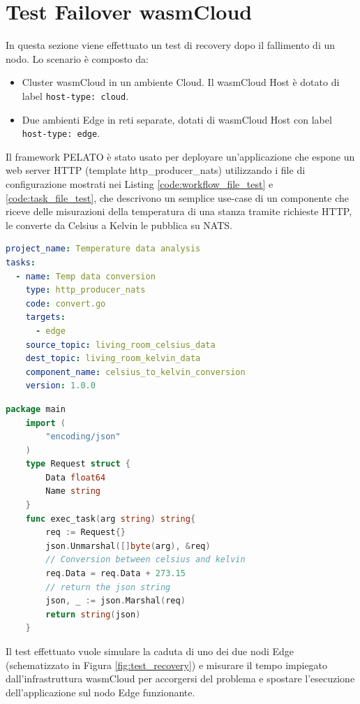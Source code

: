 \section{Test Failover wasmCloud}

In questa sezione viene effettuato un test di recovery dopo il fallimento di un nodo. Lo scenario è composto da:
\begin{itemize}
    \item Cluster wasmCloud in un ambiente Cloud. Il wasmCloud Host è dotato di label \texttt{host-type: cloud}.
    \item Due ambienti Edge in reti separate, dotati di wasmCloud Host con label \texttt{host-type: edge}.
\end{itemize}

Il framework PELATO è stato usato per deployare un'applicazione che espone un web server HTTP (template http\_producer\_nats) utilizzando i file di configurazione mostrati nei Listing \ref{code:workflow_file_test} e \ref{code:task_file_test}, che descrivono un semplice use-case di un componente che riceve delle misurazioni della temperatura di una stanza tramite richieste HTTP, le converte da Celsius a Kelvin le pubblica su NATS. 

\begin{lstlisting}[language=yaml, caption={Workflow test recovery}, captionpos=b, label={code:workflow_file_test}, keepspaces=true]
project_name: Temperature data analysis
tasks:
  - name: Temp data conversion
    type: http_producer_nats
    code: convert.go
    targets:
      - edge
    source_topic: living_room_celsius_data
    dest_topic: living_room_kelvin_data
    component_name: celsius_to_kelvin_conversion
    version: 1.0.0
\end{lstlisting}

\begin{lstlisting}[language=Go, caption={Task file test recovery}, captionpos=b, label={code:task_file_test}, keepspaces=true]
    package main
    import (
    	"encoding/json"
    )
    type Request struct {
        Data float64
        Name string
    }
    func exec_task(arg string) string{
        req := Request{}
    	json.Unmarshal([]byte(arg), &req)
    	// Conversion between celsius and kelvin
    	req.Data = req.Data + 273.15
    	// return the json string
    	json, _ := json.Marshal(req)
    	return string(json)
    }
\end{lstlisting}

Il test effettuato vuole simulare la caduta di uno dei due nodi Edge (schematizzato in Figura \ref{fig:test_recovery}) e misurare il tempo impiegato dall'infrastruttura wasmCloud per accorgersi del problema e spostare l'esecuzione dell'applicazione sul nodo Edge funzionante.

